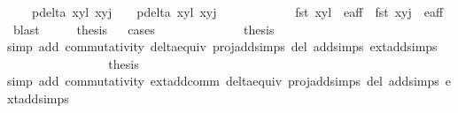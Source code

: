 \begin{isabellebody}
\ \ \ {\isacharparenleft}{}{\isacharparenright}\ {\isachardoublequoteopen}{\isacharparenleft}p{\isacharunderscore}delta\ {\isacharparenleft}{\isacharparenleft}x{}{\isacharcomma}y{}{\isacharparenright}{\isacharcomma}l{\isacharparenright}\ {\isacharparenleft}{\isacharparenleft}x{}{\isacharcomma}y{}{\isacharparenright}{\isacharcomma}j{\isacharparenright}\ {\isacharequal}\ {}\ {\isasymand}\ p{\isacharunderscore}delta{\isacharprime}\ {\isacharparenleft}{\isacharparenleft}x{}{\isacharcomma}y{}{\isacharparenright}{\isacharcomma}l{\isacharparenright}\ {\isacharparenleft}{\isacharparenleft}x{}{\isacharcomma}y{}{\isacharparenright}{\isacharcomma}j{\isacharparenright}\ {\isacharequal}\ {}{\isacharparenright}\ {\isasymor}\ \isanewline
\ \ \ \ \ \ \ \ fst\ {\isacharparenleft}{\isacharparenleft}x{}{\isacharcomma}y{}{\isacharparenright}{\isacharcomma}l{\isacharparenright}\ {\isasymnotin}\ e{\isacharunderscore}aff\ {\isasymor}\ fst\ {\isacharparenleft}{\isacharparenleft}x{}{\isacharcomma}y{}{\isacharparenright}{\isacharcomma}j{\isacharparenright}\ {\isasymnotin}\ e{\isacharunderscore}aff{\isachardoublequoteclose}\ \isamarkupfalse%
\ blast\isanewline
\ \ \isamarkupfalse%
\ \isamarkupfalse%
\ {\isacharquery}thesis\isanewline
\ \ \isamarkupfalse%
{\isacharparenleft}cases{\isacharparenright}\isanewline
\ \ \ \ \isamarkupfalse%
\ {}\isanewline
\ \ \ \ \isamarkupfalse%
\ \isamarkupfalse%
\ {\isacharquery}thesis\ \isanewline
\ \ \ \ \ \ \isamarkupfalse%
{\isacharparenleft}simp\ add{\isacharcolon}\ commutativity\ delta{\isacharunderscore}equiv\ proj{\isacharunderscore}add{\isachardot}simps\ del{\isacharcolon}\ add{\isachardot}simps\ ext{\isacharunderscore}add{\isachardot}simps{\isacharparenright}\ \ \isanewline
\ \ \isamarkupfalse%
\isanewline
\ \ \ \ \isamarkupfalse%
\ {}\isanewline
\ \ \ \ \isamarkupfalse%
\ \isamarkupfalse%
\ {\isacharquery}thesis\ \isanewline
\ \ \ \ \ \ \isamarkupfalse%
{\isacharparenleft}simp\ add{\isacharcolon}\ commutativity\ ext{\isacharunderscore}add{\isacharunderscore}comm\ delta{\isacharunderscore}equiv\ proj{\isacharunderscore}add{\isachardot}simps\ del{\isacharcolon}\ add{\isachardot}simps\ ext{\isacharunderscore}add{\isachardot}simps{\isacharparenright}\ \ \isanewline

\end{isabellebody}
